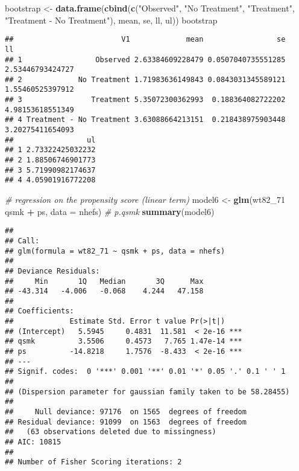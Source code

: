 \documentclass[
  10pt,
]{book}
\newenvironment{Shaded}{\begin{snugshade}}{\end{snugshade}}
\newcommand{\CommentTok}[1]{\textcolor[rgb]{0.56,0.35,0.01}{\textit{#1}}}
\newcommand{\DataTypeTok}[1]{\textcolor[rgb]{0.13,0.29,0.53}{#1}}
\newcommand{\DecValTok}[1]{\textcolor[rgb]{0.00,0.00,0.81}{#1}}
\newcommand{\KeywordTok}[1]{\textcolor[rgb]{0.13,0.29,0.53}{\textbf{#1}}}
\newcommand{\NormalTok}[1]{#1}
\newcommand{\OperatorTok}[1]{\textcolor[rgb]{0.81,0.36,0.00}{\textbf{#1}}}
\newcommand{\StringTok}[1]{\textcolor[rgb]{0.31,0.60,0.02}{#1}}
\begin{document}
\begin{Shaded}
\begin{Highlighting}[]
\NormalTok{bootstrap <-}\StringTok{ }\KeywordTok{data.frame}\NormalTok{(}\KeywordTok{cbind}\NormalTok{(}\KeywordTok{c}\NormalTok{(}\StringTok{"Observed"}\NormalTok{, }\StringTok{"No Treatment"}\NormalTok{, }\StringTok{"Treatment"}\NormalTok{, }
                                \StringTok{"Treatment - No Treatment"}\NormalTok{), mean, se, ll, ul))}
\NormalTok{bootstrap}
\end{Highlighting}
\end{Shaded}

\begin{verbatim}
##                         V1             mean                 se               ll
## 1                 Observed 2.63384609228479 0.0507040735551285 2.53446793424727
## 2             No Treatment 1.71983636149843 0.0843031345589121 1.55460525397912
## 3                Treatment 5.35072300362993  0.188364082722202 4.98153618551349
## 4 Treatment - No Treatment 3.63088664213151  0.218438975903448 3.20275411654093
##                 ul
## 1 2.73322425032232
## 2 1.88506746901773
## 3 5.71990982174637
## 4 4.05901916772208
\end{verbatim}

\begin{Shaded}
\begin{Highlighting}[]
\CommentTok{# regression on the propensity score (linear term)}
\NormalTok{model6 <-}\StringTok{ }\KeywordTok{glm}\NormalTok{(wt82_}\DecValTok{71} \OperatorTok{~}\StringTok{ }\NormalTok{qsmk }\OperatorTok{+}\StringTok{ }\NormalTok{ps, }\DataTypeTok{data =}\NormalTok{ nhefs) }\CommentTok{# p.qsmk}
\KeywordTok{summary}\NormalTok{(model6)}
\end{Highlighting}
\end{Shaded}

\begin{verbatim}
## 
## Call:
## glm(formula = wt82_71 ~ qsmk + ps, data = nhefs)
## 
## Deviance Residuals: 
##     Min       1Q   Median       3Q      Max  
## -43.314   -4.006   -0.068    4.244   47.158  
## 
## Coefficients:
##             Estimate Std. Error t value Pr(>|t|)    
## (Intercept)   5.5945     0.4831  11.581  < 2e-16 ***
## qsmk          3.5506     0.4573   7.765 1.47e-14 ***
## ps          -14.8218     1.7576  -8.433  < 2e-16 ***
## ---
## Signif. codes:  0 '***' 0.001 '**' 0.01 '*' 0.05 '.' 0.1 ' ' 1
## 
## (Dispersion parameter for gaussian family taken to be 58.28455)
## 
##     Null deviance: 97176  on 1565  degrees of freedom
## Residual deviance: 91099  on 1563  degrees of freedom
##   (63 observations deleted due to missingness)
## AIC: 10815
## 
## Number of Fisher Scoring iterations: 2
\end{verbatim}
\end{document}

